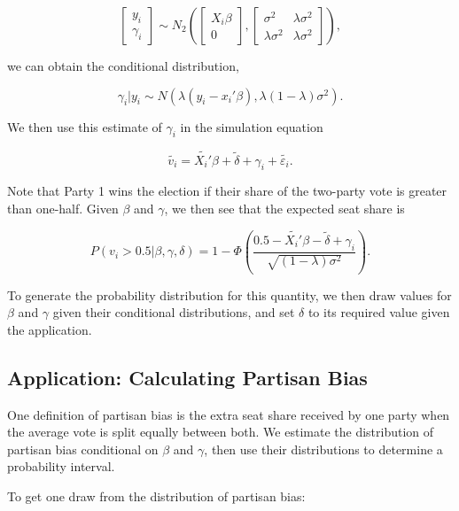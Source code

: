 \documentclass[oneside,letterpaper,titlepage]{article}
\begin{document}
\[ \left[ \begin{array}{c} y_i \\ \gamma_i \end{array} \right] \sim N_2 \left( \left[ \begin{array}{c} X_i\beta \\ 0 \end{array} \right], \left[ \begin{array}{cc} \sigma^2 & \lambda \sigma^2 \\ \lambda \sigma^2 & \lambda \sigma^2 \end{array} \right] \right), \]

\noindent we can obtain the conditional distribution,

\[ \gamma_i|y_i \sim N(\lambda(y_i-x_i'\beta),\lambda(1-\lambda)\sigma^2). \]

We then use this estimate of $\gamma_i$ in the simulation equation

\[ \tilde{v_i} = \tilde{X_i'}\beta + \tilde{\delta} + \gamma_i + \tilde{\varepsilon_i}. \]

Note that Party 1 wins the election if their share of the two-party vote is greater than one-half. Given $\beta$ and $\gamma$, we then see that the expected seat share is

\[ P(v_i>0.5|\beta,\gamma,\delta) = 1-\Phi\left( \frac{0.5-\tilde{X_i'}\beta-\tilde{\delta} + \gamma_i}{\sqrt{(1-\lambda) \sigma^2}} \right). \]

To generate the probability distribution for this quantity, we then draw values for $\beta$ and $\gamma$ given their conditional distributions, and set $\delta$ to its required value given the application.

\subsection*{Application: Calculating Partisan Bias}

One definition of partisan bias is the extra seat share received by one party when the average vote is split equally between both. We estimate the distribution of partisan bias conditional on $\beta$ and $\gamma$, then use their distributions to determine a probability interval.

To get one draw from the distribution of partisan bias:
\end{document}
